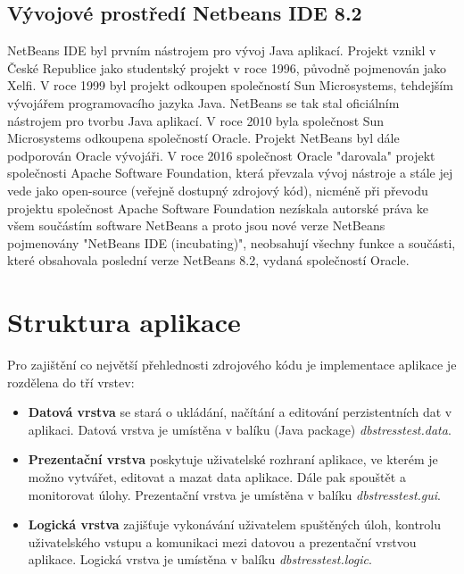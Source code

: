 \documentclass[czech,bachelor,public,dept460,male,cpdeclaration,twoside]{diploma}
\begin{document}
\subsection{Vývojové prostředí Netbeans IDE 8.2} \label{netbeans}
NetBeans IDE byl prvním nástrojem pro vývoj Java aplikací. Projekt vznikl v České Republice jako studentský projekt v roce 1996, původně pojmenován jako Xelfi. V roce 1999 byl projekt odkoupen společností Sun Microsystems, tehdejším vývojářem programovacího jazyka Java. NetBeans se tak stal oficiálním nástrojem pro tvorbu Java aplikací. V roce 2010 byla společnost Sun Microsystems odkoupena společností Oracle. Projekt NetBeans byl dále podporován Oracle vývojáři. V roce 2016 společnost Oracle "darovala" projekt společnosti Apache Software Foundation, která převzala vývoj nástroje a stále jej vede jako open-source (veřejně dostupný zdrojový kód), nicméně při převodu projektu společnost Apache Software Foundation nezískala autorské práva ke všem součástím software NetBeans a proto jsou nové verze NetBeans pojmenovány "NetBeans IDE (incubating)", neobsahují všechny funkce a součásti, které obsahovala poslední verze NetBeans 8.2, vydaná společností Oracle. \cite{netbeans}


\section{Struktura aplikace}
Pro zajištění co největší přehlednosti zdrojového kódu je implementace aplikace je rozdělena do tří vrstev:
\begin{itemize}
  	\item \textbf{Datová vrstva} se stará o ukládání, načítání a editování perzistentních dat v aplikaci. Datová vrstva je umístěna v balíku (Java package) \textit{dbstresstest.data}.
  	\item \textbf{Prezentační vrstva} poskytuje uživatelské rozhraní aplikace, ve kterém je možno vytvářet, editovat a mazat data aplikace. Dále pak spouštět a monitorovat úlohy. Prezentační vrstva je umístěna v balíku \textit{dbstresstest.gui}.
  	\item \textbf{Logická vrstva} zajišťuje vykonávání uživatelem spuštěných úloh, kontrolu uživatelského vstupu a komunikaci mezi datovou a prezentační vrstvou aplikace. Logická vrstva je umístěna v balíku \textit{dbstresstest.logic}.
\end{itemize}  	
\end{document}
